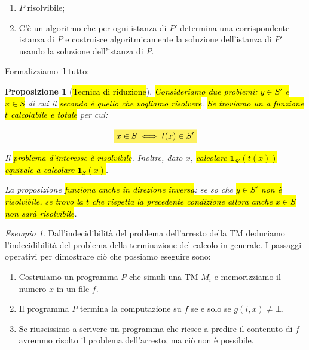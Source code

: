 \documentclass[a4paper,11pt,twoside]{article}
\theoremstyle{plain}
\newtheorem{prop}{Proposizione}[section]
\theoremstyle{definition}
\theoremstyle{remark}
\newtheorem{esempio}{Esempio}[section]
\newcommand{\mhl}[1]{\colorbox{hlcolor}{$\displaystyle #1$}}
\begin{document}
\begin{enumerate}
  \item $P$ risolvibile;
  \item C'è un algoritmo che per ogni istanza di $P'$ determina una
    corrispondente istanza di $P$ e costruisce algoritmicamente la soluzione
    dell'istanza di $P'$ usando la soluzione dell'istanza di $P$.
\end{enumerate}

Formalizziamo il tutto:

\begin{prop}[\hl{Tecnica di riduzione}]\label{thm:riduzione}
  \hl{Consideriamo due problemi: $y \in S'$ e $x \in S$} di cui il \hl{secondo è
  quello che vogliamo risolvere}. \hl{Se troviamo un a funzione $t$ calcolabile
  e totale} per cui:

  \begin{equation}
    \mhl{
      x \in S \iff t(x) \in S'
    }
  \end{equation}

  Il \hl{problema d'interesse è risolvibile}. Inoltre, dato $x$, \hl{calcolare
  $\mathbf{1}_{S'}(t(x))$ equivale a calcolare $\mathbf{1}_S(x)$}.

  La proposizione \hl{funziona anche in direzione inversa}: se so che \hl{$y \in
  S'$ non è risolvibile, se trovo la $t$ che rispetta la precedente condizione
  allora anche $x \in S$ non sarà risolvibile}.
\end{prop}

\begin{esempio}
  Dall'indecidibilità del problema dell'arresto della TM deduciamo
  l'indecidibilità del problema della terminazione del calcolo in generale. I
  passaggi operativi per dimostrare ciò che possiamo eseguire sono:

  \begin{enumerate}
    \item Costruiamo un programma $P$ che simuli una TM $M_i$ e memorizziamo il
      numero $x$ in un file $f$.
    \item Il programma $P$ termina la computazione su $f$ se e solo se $g(i,x)
      \neq \bot$.
    \item Se riuscissimo a scrivere un programma che riesce a predire il
      contenuto di $f$ avremmo risolto il problema dell'arresto, ma ciò non è
      possibile.
  \end{enumerate}
\end{esempio}
\end{document}
